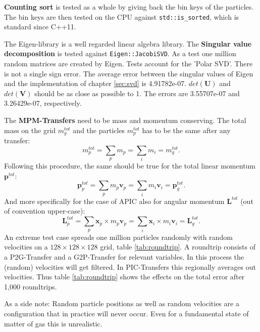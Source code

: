 \documentclass[m,times]{cgMA}
\begin{document}
\textbf{Counting sort} is tested as a whole by giving back the bin keys of the particles. The bin keys are then tested on the CPU against \texttt{std::is\_sorted}, which is standard since C++11.

The Eigen-library \cite{EIGEN:LIBRARY} is a well regarded linear algebra library. The \textbf{Singular value decomposition} is tested against \texttt{Eigen::JacobiSVD}. As a test one million random matrices are created by Eigen. Tests account for the 'Polar SVD'. There is not a single sign error. The average error between the singular values of Eigen and the implementation of chapter \ref{sec:svd} is 4.91782e-07. $det(\boldsymbol{U})$ and $det(\boldsymbol{V})$ should be as close as possible to 1. The errors are 3.55707e-07 and 3.26429e-07, respectively.

The \textbf{MPM-Transfers} need to be mass and momentum conserving. The total mass on the grid $m_g^{tot}$ and the particles $m_p^{tot}$ has to be the same after any transfer:
\begin{equation}
  m_{p}^{tot}= \sum_p m_p =  \sum_i m_i = m_{g}^{tot}.
\end{equation}
Following this procedure, the same should be true for the total linear momentum $\boldsymbol{p}^{tot}$:
\begin{equation}
  \boldsymbol{p}_{p}^{tot}= \sum_p m_p \boldsymbol{v}_p=  \sum_i m_i \boldsymbol{v}_i = \boldsymbol{p}_{g}^{tot}.
\end{equation}
And more specifically for the case of APIC also for angular momentum $\boldsymbol{L}^{tot}$ (out of convention upper-case):
\begin{equation}
  \boldsymbol{L}_{p}^{tot}= \sum_p \boldsymbol{x}_p \times m_p \boldsymbol{v}_p =  \sum_i \boldsymbol{x}_i \times m_i \boldsymbol{v}_i = \boldsymbol{L}_{g}^{tot}.
\end{equation}
An extreme test case spreads one million particles randomly with random velocities on a $128\times128\times128$ grid, table \ref{tab:roundtrip}. A roundtrip consists of a P2G-Transfer and a G2P-Transfer for relevant variables. In this process the (random) velocities will get filtered. In PIC-Transfers this regionally averages out velocities. Thus table \ref{tab:roundtrip} shows the effects on the total error after 1,000 roundtrips.

As a side note: Random particle positions as well as random velocities are a configuration that in practice will never occur. Even for a fundamental state of matter of gas this is unrealistic.
\end{document}

